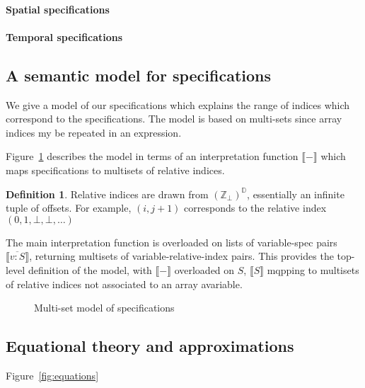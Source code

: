 \documentclass[9pt]{sigplanconf}
\newcounter{block}
\theoremstyle{definition}
\newtheorem{definition}[block]{Definition}
\newcommand{\interp}[1]{\llbracket{#1}\rrbracket}
\begin{document}
\paragraph{Spatial specifications}


\paragraph{Temporal specifications}


\subsection{A semantic model for specifications}
\label{sec:semantics}

\newcommand{\relix}{(\mathbb{Z}_\bot)^\mathbb{D}}

We give a model of our specifications which explains
the range of indices which correspond to the specifications.
The model is based on multi-sets since array indices my be repeated
in an expression.

Figure~\ref{fig:model} describes the model in terms of
an interpretation function $\interp{-}$ which maps specifications
to multisets of relative indices.

\begin{definition}Relative indices are drawn
from $(\mathbb{Z}_{\bot})^{\mathbb{D}}$, essentially an infinite
tuple of offsets. For example, $(i, j+1)$ corresponds to
the relative index $(0, 1, \bot, \bot, \ldots)$
\end{definition}

The main interpretation function is overloaded on lists of
variable-spec pairs $\interp{\overline{v : S}}$,
returning multisets of variable-relative-index pairs. This provides
the top-level definition of the model, with $\interp{-}$ overloaded
on $S$, $\interp{S}$ mqpping to multisets of
relative indices not associated to an array avariable.

\begin{figure}

\caption{Multi-set model of specifications}
\label{fig:model}
\end{figure}

\subsection{Equational theory and approximations}
\label{sec:eqs}

Figure~\ref{fig:equations}
\end{document}
